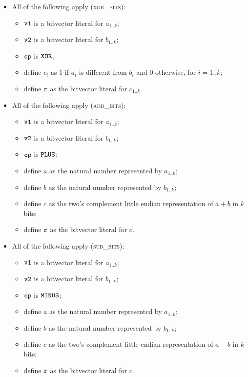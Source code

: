 \documentclass{book}
\begin{document}
\begin{itemize}
  \item All of the following apply (\textsc{xor\_bits}):
  \begin{itemize}
    \item $\texttt{v1}$ is a bitvector literal for $a_{1..k}$;
    \item $\texttt{v2}$ is a bitvector literal for $b_{1..k}$;
    \item $\texttt{op}$ is $\texttt{XOR}$;
    \item define $c_i$ as $1$ if $a_i$ is different from $b_i$ and $0$ otherwise, for $i=1..k$;
    \item define $\texttt{r}$ as the bitvector literal for $c_{1..k}$.
  \end{itemize}

  \item All of the following apply (\textsc{add\_bits}):
  \begin{itemize}
    \item $\texttt{v1}$ is a bitvector literal for $a_{1..k}$;
    \item $\texttt{v2}$ is a bitvector literal for $b_{1..k}$;
    \item $\texttt{op}$ is $\texttt{PLUS}$;
    \item define $a$ as the natural number represented by $a_{1..k}$;
    \item define $b$ as the natural number represented by $b_{1..k}$;
    \item define $c$ as the two's complement little endian representation of $a+b$ in $k$ bits;
    \item define $\texttt{r}$ as the bitvector literal for $c$.
  \end{itemize}

  \item All of the following apply (\textsc{sub\_bits}):
  \begin{itemize}
    \item $\texttt{v1}$ is a bitvector literal for $a_{1..k}$;
    \item $\texttt{v2}$ is a bitvector literal for $b_{1..k}$;
    \item $\texttt{op}$ is $\texttt{MINUS}$;
    \item define $a$ as the natural number represented by $a_{1..k}$;
    \item define $b$ as the natural number represented by $b_{1..k}$;
    \item define $c$ as the two's complement little endian representation of $a-b$ in $k$ bits;
    \item define $\texttt{r}$ as the bitvector literal for $c$.
  \end{itemize}


\end{itemize}
\end{document}
